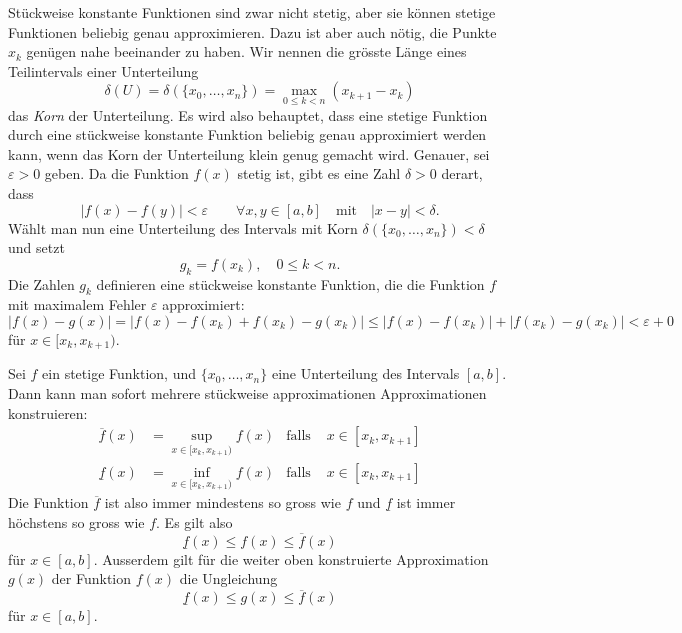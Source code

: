Stückweise konstante Funktionen sind zwar nicht stetig, aber sie können
stetige Funktionen beliebig genau approximieren.
Dazu ist aber auch nötig, die Punkte $x_k$ genügen nahe beeinander zu
haben.
Wir nennen die grösste Länge eines Teilintervals einer Unterteilung
\[
\delta(U)
=
\delta(\{x_0,\dots,x_n\})
=
\max_{0\le k < n} (x_{k+1}-x_{k})
\]
das {\em Korn} der Unterteilung.
Es wird also behauptet, dass eine stetige Funktion durch eine stückweise
konstante Funktion beliebig genau approximiert werden kann, wenn das
Korn der Unterteilung klein genug gemacht wird.
Genauer, sei $\varepsilon>0$ geben.
Da die Funktion $f(x)$ stetig ist, gibt es eine Zahl $\delta>0$ derart,
dass
\[
|f(x) - f(y)| < \varepsilon\qquad\forall x,y\in [a,b]\quad\text{mit}\quad
|x-y|<\delta.
\]
Wählt man nun eine Unterteilung des Intervals mit Korn
$\delta(\{x_0,\dots,x_n\}) < \delta$ und setzt
\[
g_k = f(x_k),\quad 0\le k < n.
\]
Die Zahlen $g_k$ definieren eine stückweise konstante Funktion, die 
die Funktion $f$ mit maximalem Fehler $\varepsilon$ approximiert:
\[
|f(x)-g(x)|
=
|f(x) - f(x_k) + f(x_k) - g(x_k)|
\le
|f(x) - f(x_k)| + |f(x_k) - g(x_k)|
<
\varepsilon + 0
\]
für $x\in [x_k,x_{k+1})$.

Sei $f$ ein stetige Funktion, und $\{x_0,\dots,x_n\}$ eine Unterteilung
des Intervals $[a,b]$.
Dann kann man sofort mehrere stückweise approximationen Approximationen 
konstruieren:
\begin{align*}
\overline{f}(x)
&= 
\sup_{x\in[x_k,x_{k+1})} f(x)
&\text{falls }&x\in[x_k,x_{k+1}]
\\
\underline{f}(x)
&= 
\inf_{x\in[x_k,x_{k+1})} f(x)
&\text{falls }&x\in[x_k,x_{k+1}]
\end{align*}
Die Funktion $\overline{f}$ ist also immer mindestens so gross wie $f$
und $\underline{f}$ ist immer höchstens so gross wie $f$.
Es gilt also
\[
\underline{f}(x) \le f(x) \le \overline{f}(x)
\]
für $x\in[a,b]$.
Ausserdem gilt für die weiter oben konstruierte Approximation $g(x)$ der
Funktion $f(x)$ die Ungleichung
\[
\underline{f}(x) \le g(x) \le \overline{f}(x)
\]
für $x\in[a,b]$.


